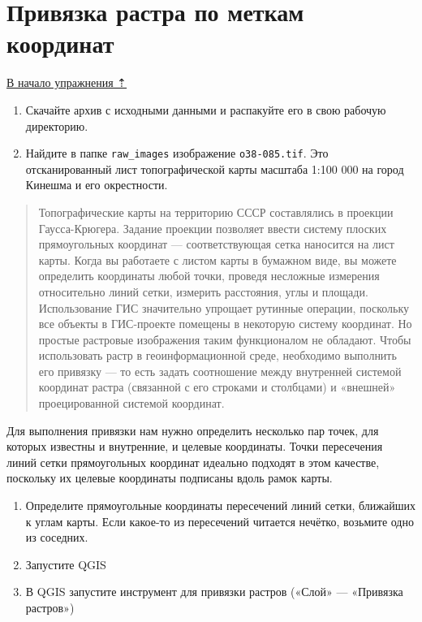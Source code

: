 \documentclass[
  12pt,
]{book}
\begin{document}
\hypertarget{raster-reference-input}{%
\section{Привязка растра по меткам координат}\label{raster-reference-input}}

\protect\hyperlink{raster-reference}{В начало упражнения ⇡}

\begin{enumerate}
\def\labelenumi{\arabic{enumi}.}
\item
  Скачайте архив с исходными данными и распакуйте его в свою рабочую директорию.
\item
  Найдите в папке \texttt{raw\_images} изображение \texttt{o38-085.tif}. Это отсканированный лист топографической карты масштаба 1:100 000 на город Кинешма и его окрестности.
\end{enumerate}

\begin{quote}
Топографические карты на территорию СССР составлялись в проекции Гаусса-Крюгера. Задание проекции позволяет ввести систему плоских прямоугольных координат --- соответствующая сетка наносится на лист карты. Когда вы работаете с листом карты в бумажном виде, вы можете определить координаты любой точки, проведя несложные измерения относительно линий сетки, измерить расстояния, углы и площади. Использование ГИС значительно упрощает рутинные операции, поскольку все объекты в ГИС-проекте помещены в некоторую систему координат. Но простые растровые изображения таким функционалом не обладают.
Чтобы использовать растр в геоинформационной среде, необходимо выполнить его привязку --- то есть задать соотношение между внутренней системой координат растра (связанной с его строками и столбцами) и «внешней» проецированной системой координат.
\end{quote}

Для выполнения привязки нам нужно определить несколько пар точек, для которых известны и внутренние, и целевые координаты. Точки пересечения линий сетки прямоугольных координат идеально подходят в этом качестве, поскольку их целевые координаты подписаны вдоль рамок карты.

\begin{enumerate}
\def\labelenumi{\arabic{enumi}.}
\setcounter{enumi}{2}
\item
  Определите прямоугольные координаты пересечений линий сетки, ближайших к углам карты. Если какое-то из пересечений читается нечётко, возьмите одно из соседних.
\item
  Запустите QGIS
\item
  В QGIS запустите инструмент для привязки растров («Слой» --- «Привязка растров»)
\end{enumerate}
\end{document}

